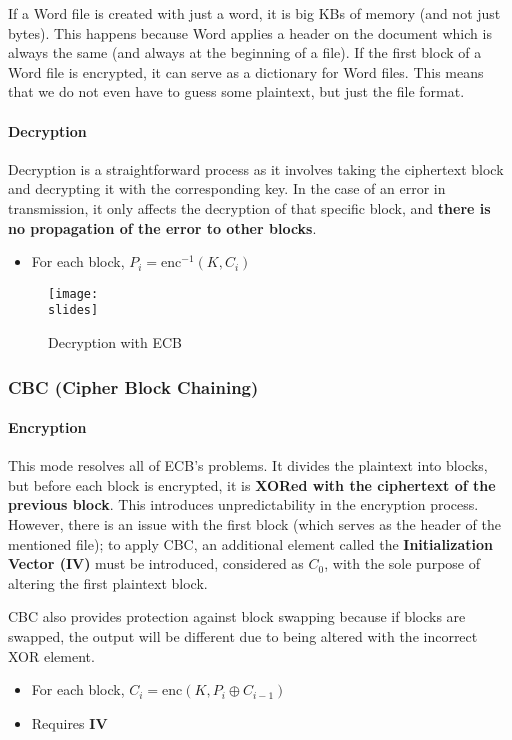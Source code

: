If a Word file is created with just a word, it is big KBs of memory (and not just bytes). This happens because
Word applies a header on the document which is always the same (and always at the beginning of a file). If
the first block of a Word file is encrypted, it can serve as a dictionary for Word files. This means that we do not
even have to guess some plaintext, but just the file format.


\paragraph*{Decryption}
Decryption is a straightforward process as it involves taking the ciphertext block and decrypting it with the corresponding key. In the case of an error in transmission, it only affects the decryption of that specific block, and \textbf{there is no propagation of the error to other blocks}.
\begin{itemize}
    \item For each block, $P_i = \text{enc}^{-1}(K, C_i)$
\end{itemize}
\begin{figure}[h]
    \centering
    \texttt{[image: \\slides]}
    \caption{Decryption with ECB}
\end{figure}


\subsubsection{CBC (Cipher Block Chaining)}

\paragraph*{Encryption}
This mode resolves all of ECB's problems.
It divides the plaintext into blocks, but before each block is encrypted, it is \textbf{XORed with the ciphertext of the previous block}.
This introduces unpredictability in the encryption process.
However, there is an issue with the first block (which serves as the header of the mentioned file); to apply CBC, an additional element called the \textbf{Initialization Vector (IV)} must be introduced, considered as \(C_0\), with the sole purpose of altering the first plaintext block.

CBC also provides protection against block swapping because if blocks are swapped, the output will be different due to being altered with the incorrect XOR element.
\begin{itemize}
    \item For each block, $C_i = \text{enc}(K, P_i \oplus C_{i-1})$
    \item Requires \textbf{IV}
\end{itemize}


